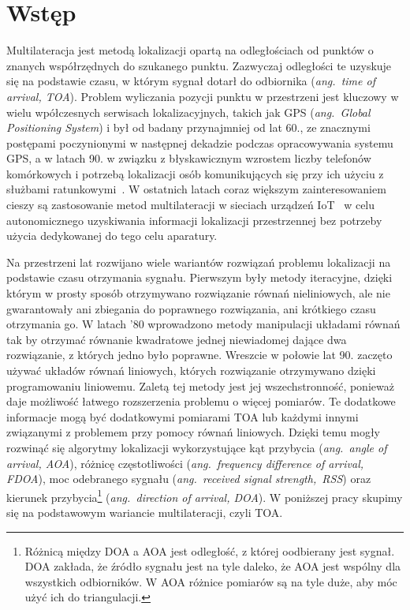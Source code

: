\chapter*{Wstęp}\label{chap:introduction}

Multilateracja jest metodą lokalizacji opartą na odległościach od punktów o znanych współrzędnych do szukanego punktu. Zazwyczaj odległości te uzyskuje się na podstawie czasu, w którym sygnał dotarł do odbiornika (\textit{ang.\ time of arrival, TOA}). Problem wyliczania pozycji punktu w przestrzeni jest kluczowy w wielu wpółczesnych serwisach lokalizacyjnych, takich jak GPS (\textit{ang.\ Global Positioning System}) i był od badany przynajmniej od lat 60., ze znacznymi postępami poczynionymi w następnej dekadzie podczas opracowywania systemu GPS, a w latach 90. w związku z błyskawicznym wzrostem liczby telefonów komórkowych i potrzebą lokalizacji osób komunikujących się przy ich użyciu z służbami ratunkowymi~\cite{govinfo}. W ostatnich latach coraz większym zainteresowaniem cieszy są zastosowanie metod multilateracji w sieciach urządzeń IoT~\cite{9184896} w celu autonomicznego uzyskiwania informacji lokalizacji przestrzennej bez potrzeby użycia dedykowanej do tego celu aparatury.

Na przestrzeni lat rozwijano wiele wariantów rozwiązań problemu lokalizacji na podstawie czasu otrzymania sygnału. Pierwszym były metody iteracyjne, dzięki którym w prosty sposób otrzymywano rozwiązanie równań nieliniowych, ale nie gwarantowały ani zbiegania do poprawnego rozwiązania, ani krótkiego czasu otrzymania go. W latach '80 wprowadzono metody manipulacji układami równań tak by otrzymać równanie kwadratowe jednej niewiadomej dające dwa rozwiązanie, z których jedno było poprawne. Wreszcie w połowie lat 90. zaczęto używać układów równań liniowych, których rozwiązanie otrzymywano dzięki programowaniu liniowemu. Zaletą tej metody jest jej wszechstronność, ponieważ daje możliwość łatwego rozszerzenia problemu o więcej pomiarów. Te dodatkowe informacje mogą być dodatkowymi  pomiarami TOA lub każdymi innymi związanymi z problemem przy pomocy równań liniowych. Dzięki temu mogły rozwinąć się algorytmy lokalizacji wykorzystujące kąt przybycia (\textit{ang.\ angle of arrival, AOA}), różnicę częstotliwości (\textit{ang.\ frequency difference of arrival, FDOA}), moc odebranego sygnału (\textit{ang.\ received signal strength,\ RSS}) oraz kierunek przybycia\footnote{Różnicą między DOA a AOA jest odległość, z której oodbierany jest sygnał. DOA zakłada, że źródło sygnału jest na tyle daleko, że AOA jest wspólny dla wszystkich odbiorników. W AOA różnice pomiarów są na tyle duże, aby móc użyć ich do triangulacji.} (\textit{ang.\ direction of arrival, DOA}). W poniższej pracy skupimy się na podstawowym wariancie multilateracji, czyli TOA.

